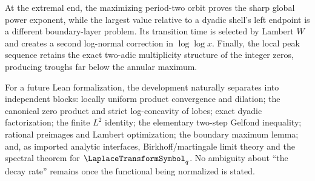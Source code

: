 \documentclass[11pt,oneside]{article}
\theoremstyle{definition}
\theoremstyle{remark}
\begin{document}
At the extremal end, the maximizing period-two orbit proves the sharp global
power exponent, while the largest value relative to a dyadic shell's left
endpoint is a different boundary-layer problem.  Its transition time is
selected by Lambert $W$ and creates a second log-normal correction in
$\log\log x$.  Finally, the local peak sequence retains the exact two-adic
multiplicity structure of the integer zeros, producing troughs far below the
annular maximum.

For a future Lean formalization, the development naturally separates into
independent blocks: locally uniform product convergence and dilation; the
canonical zero product and strict log-concavity of lobes; exact dyadic
factorization; the finite $L^2$ identity; the elementary two-step Gelfond
inequality; rational preimages and Lambert optimization; the boundary maximum
lemma; and, as imported analytic interfaces, Birkhoff/martingale limit theory
and the spectral theorem for $\LaplaceTransformSymbol_q$.  No ambiguity about ``the decay rate''
remains once the functional being normalized is stated.
\end{document}
